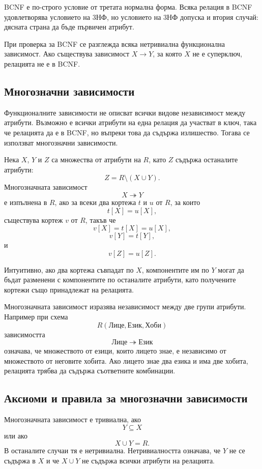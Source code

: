 BCNF е по-строго условие от третата нормална форма. Всяка релация в BCNF удовлетворява условието на 3НФ, но условието на 3НФ допуска и втория случай: дясната страна да бъде първичен атрибут.

При проверка за BCNF се разглежда всяка нетривиална функционална зависимост. Ако съществува зависимост $X\to Y$, за която $X$ не е суперключ, релацията не е в BCNF.

\subsection{Многозначни зависимости}\label{s:24.1.10}

Функционалните зависимости не описват всички видове независимост между атрибути. Възможно е всички атрибути на една релация да участват в ключ, така че релацията да е в BCNF, но въпреки това да съдържа излишество. Тогава се използват многозначни зависимости.

\begin{defn}
Нека $X$, $Y$ и $Z$ са множества от атрибути на $R$, като $Z$ съдържа останалите атрибути:
\[
Z=R\setminus(X\cup Y).
\]
Многозначната зависимост
\[
X\twoheadrightarrow Y
\]
е изпълнена в $R$, ако за всеки два кортежа $t$ и $u$ от $R$, за които
\[
t[X]=u[X],
\]
съществува кортеж $v$ от $R$, такъв че
\[
v[X]=t[X]=u[X],
\]
\[
v[Y]=t[Y],
\]
и
\[
v[Z]=u[Z].
\]
\end{defn}

Интуитивно, ако два кортежа съвпадат по $X$, компонентите им по $Y$ могат да бъдат разменени с компонентите по останалите атрибути, като получените кортежи също принадлежат на релацията.

Многозначната зависимост изразява независимост между две групи атрибути. Например при схема
\[
R(\mathrm{Лице},\mathrm{Език},\mathrm{Хоби})
\]
зависимостта
\[
\mathrm{Лице}\twoheadrightarrow\mathrm{Език}
\]
означава, че множеството от езици, които лицето знае, е независимо от множеството от неговите хобита. Ако лицето знае два езика и има две хобита, релацията трябва да съдържа съответните комбинации.

\subsection{Аксиоми и правила за многозначни зависимости}\label{s:24.1.11}

\begin{defn}
Многозначната зависимост е тривиална, ако
\[
Y\subseteq X
\]
или ако
\[
X\cup Y=R.
\]
В останалите случаи тя е нетривиална. Нетривиалността означава, че $Y$ не се съдържа в $X$ и че $X\cup Y$ не съдържа всички атрибути на релацията.
\end{defn}

